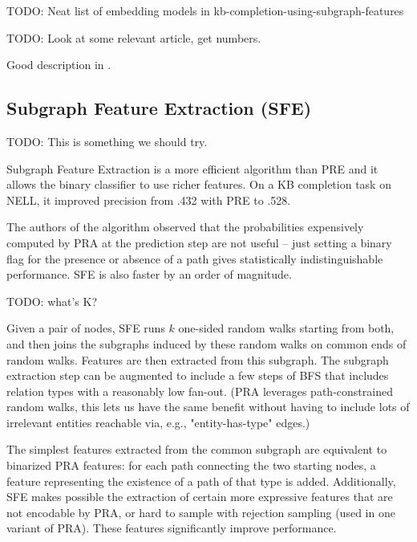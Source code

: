 TODO: Neat list of embedding models in kb-completion-using-subgraph-features

TODO: Look at some relevant article, get numbers.

Good description in \cite{random-walk-inference}.

\subsection{Subgraph Feature Extraction (SFE)}

TODO: This is something we should try.

Subgraph Feature Extraction\cite{subgraph-feature-extraction} is a more
efficient algorithm than PRE and it allows the binary classifier to use richer
features. On a KB completion task on NELL, it improved precision from .432 with
PRE to .528.


The authors of the algorithm observed that the probabilities expensively
computed by PRA at the prediction step are not
useful\cite{subgraph-feature-extraction} -- just setting a binary flag for the
presence or absence of a path gives statistically indistinguishable performance.
SFE is also faster by an order of magnitude.

TODO: what's K?

Given a pair of nodes, SFE runs $k$ one-sided random walks starting from both,
and then joins the subgraphs induced by these random walks on common ends of
random walks. Features are then extracted from this subgraph.
The subgraph extraction step can be augmented to include a few steps of BFS
that includes relation types with a reasonably low fan-out.
(PRA leverages path-constrained random walks, this lets us have the same
benefit without having to include lots of irrelevant entities reachable via,
e.g., "entity-has-type" edges.)

The simplest features extracted from the common subgraph are equivalent to
binarized PRA features: for each path connecting the two starting nodes, a
feature representing the existence of a path of that type is added.
Additionally, SFE makes possible the extraction of certain more expressive
features that are not encodable by PRA, or hard to sample with rejection
sampling (used in one variant of PRA). These features significantly improve
performance.


